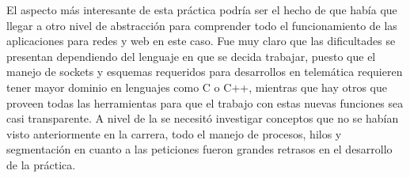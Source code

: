 El aspecto más interesante de esta práctica podría ser el hecho de que había que llegar a otro nivel de abstracción para comprender todo el
funcionamiento de las aplicaciones para redes y web en este caso. Fue muy claro que las dificultades se presentan dependiendo del lenguaje en 
que se decida trabajar, puesto que el manejo de sockets y esquemas requeridos para desarrollos en telemática requieren tener mayor dominio en
lenguajes como C o C++, mientras que hay otros que proveen todas las herramientas para que el trabajo con estas nuevas funciones sea casi
transparente.
A nivel de la se necesitó investigar conceptos que no se habían visto anteriormente en la carrera, todo el manejo de procesos, hilos y segmentación en
cuanto a las peticiones fueron grandes retrasos en el desarrollo de la práctica.\\

